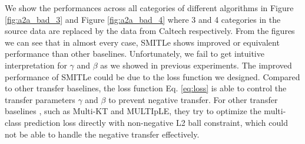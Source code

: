 We show the performances across all categories of different algorithms in Figure \ref{fig:a2a_bad_3} and Figure \ref{fig:a2a_bad_4} where 3 and 4 categories in the source data are replaced by the data from Caltech respectively. From the figures we can see that in almost every case, SMITLe shows improved or equivalent performance than other baselines. Unfortunately, we fail to get intuitive interpretation for $\gamma$ and $\beta$ as we showed in previous experiments. The improved performance of SMITLe could be due to the loss function we designed. Compared to other transfer baselines, the loss function Eq. \eqref{eq:loss} is able to control the transfer parameters $\gamma$ and $\beta$ to prevent negative transfer. For other transfer baselines , such as Multi-KT and MULTIpLE, they try to optimize the multi-class prediction loss directly with non-negative L2 ball constraint, which could not be able to handle the negative transfer effectively.


